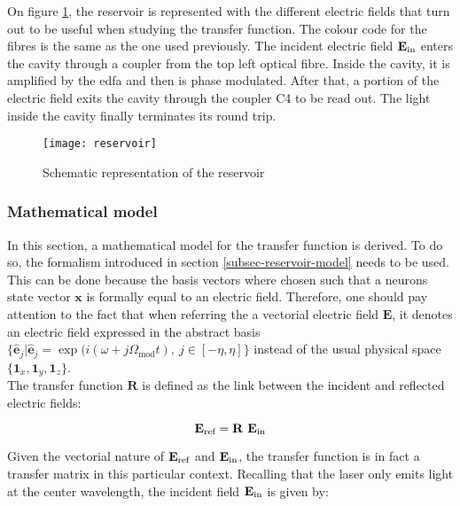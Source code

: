 On figure \ref{schematic_reservoir}, the reservoir is represented with the different electric fields that turn out to be useful when studying the transfer function. The colour code for the fibres is the same as the one used previously. The incident electric field $\mathbf{E}_{\text{in}}$ enters the cavity through a coupler from the top left optical fibre. Inside the cavity, it is amplified by the \gls{edfa} and then is phase modulated. After that, a portion of the electric field exits the cavity through the coupler C4 to be read out. The light inside the cavity finally terminates its round trip.

\begin{figure}[h]
	\centering
	\texttt{[image: reservoir]}
	\caption{Schematic representation of the reservoir}
	\label{schematic_reservoir}
\end{figure}


\subsubsection{Mathematical model}

In this section, a mathematical model for the transfer function is derived. To do so, the formalism introduced in section \ref{subsec-reservoir-model} needs to be used. This can be done because the basis vectors where chosen such that a neurons state vector $\mathbf{x}$ is formally equal to an electric field. Therefore, one should pay attention to the fact that when referring the a vectorial electric field $\mathbf{E}$, it denotes an electric field expressed in the abstract basis $\{ \hat{\mathbf{e}}_j | \hat{\mathbf{e}}_j = \exp{ (i (\omega+j\Omega_{\text{mod}}t)}, ~j\in [-\eta, \eta ] \}$ instead of the usual physical space $\{\mathbf{1}_x, \mathbf{1}_y,\mathbf{1}_z \}$.\\

The transfer function $\mathbf{R}$ is defined as the link between the incident and reflected electric fields:

\begin{equation}
	\mathbf{E}_{\text{ref}} = \mathbf{R} ~\mathbf{E}_{\text{in}}
\end{equation}

Given the vectorial nature of $\mathbf{E}_{\text{ref}}$ and $\mathbf{E}_{\text{in}}$, the transfer function is in fact a transfer matrix in this particular context. Recalling that the laser only emits light at the center wavelength, the incident field $\mathbf{E}_{\text{in}}$ is given by:

